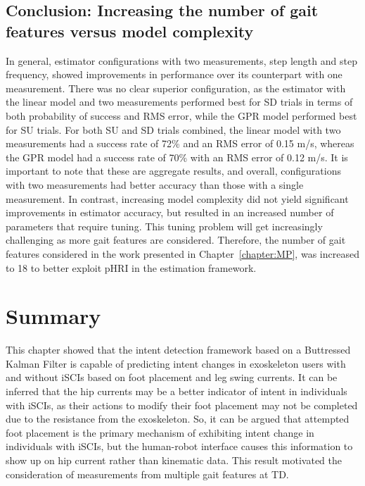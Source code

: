 \subsection{Conclusion: Increasing the number of gait features versus model complexity}\label{sec:analysis_conc}
In general, estimator configurations with two measurements, step length and step frequency, showed improvements in performance over its counterpart with one measurement. There was no clear superior configuration, as the estimator with the linear model and two measurements performed best for SD trials in terms of both probability of success and RMS error, while the GPR model performed best for SU trials. For both SU and SD trials combined, the linear model with two measurements had a success rate of 72\% and an RMS error of 0.15 m/s, whereas the GPR model had a success rate of 70\% with an RMS error of 0.12 m/s. It is important to note that these are aggregate results, and overall, configurations with two measurements had better accuracy than those with a single measurement. In contrast, increasing  model complexity did not yield significant improvements in estimator accuracy, but resulted in an increased number of parameters that require tuning. This tuning problem will get increasingly challenging as more gait features are considered. Therefore, the number of gait features considered in the work presented in Chapter~\ref{chapter:MP}, was increased to 18 to better exploit pHRI in the estimation framework.

\section{Summary}\label{sec:bkf_summary}

This chapter showed that the intent detection framework based on a Buttressed Kalman Filter is capable of predicting intent changes in exoskeleton users with and without iSCIs based on foot placement and leg swing currents. It can be inferred that the hip currents may be a better indicator of intent in individuals with iSCIs, as their actions to modify their foot placement may not be completed due to the resistance from the exoskeleton. So, it can be argued that attempted foot placement is the primary mechanism of exhibiting intent change in individuals with iSCIs, but the human-robot interface causes this information to show up on hip current rather than kinematic data. This result motivated the consideration of measurements from multiple gait features at TD.

